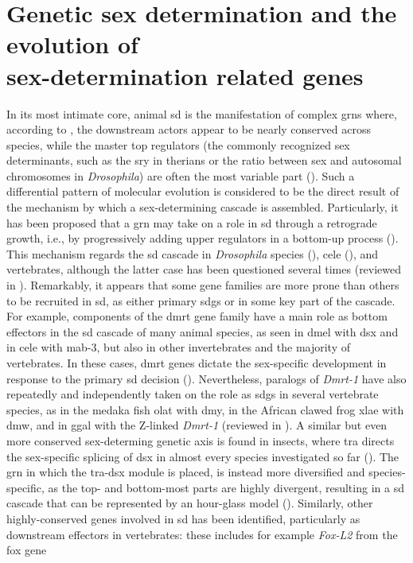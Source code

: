 \section[Genetic sex determination and the evolution of sex-determination related genes]{Genetic sex determination and the evolution of \\ sex-determination related genes}\label{section:introduction-srg}
In its most intimate core, animal \gls{sd} is the manifestation of complex \glspl{grn} where, according to , the downstream actors appear to be nearly conserved across species, while the master top regulators (the commonly recognized sex determinants, such as the \gls{sry} in therians or the ratio between sex and autosomal chromosomes in \textit{Drosophila}) are often the most variable part (). Such a differential pattern of molecular evolution is considered to be the direct result of the mechanism by which a sex-determining cascade is assembled. Particularly, it has been proposed that a \gls{grn} may take on a role in \gls{sd} through a retrograde growth, i.e., by progressively adding upper regulators in a bottom-up process (). This mechanism regards the \gls{sd} cascade in \textit{Drosophila} species (), \gls{cele} (), and vertebrates, although the latter case has been questioned several times (reviewed in ). Remarkably, it appears that some gene families are more prone than others to be recruited in \gls{sd}, as either primary \glspl{sdg} or in some key part of the cascade. For example, components of the \gls{dmrt} gene family have a main role as bottom effectors in the \gls{sd} cascade of many animal species, as seen in \gls{dmel} with \gls{dsx} and in \gls{cele} with \gls{mab-3}, but also in other invertebrates and the majority of vertebrates. In these cases, \gls{dmrt} genes dictate the sex-specific development in response to the primary \gls{sd} decision (). Nevertheless, paralogs of \textit{Dmrt-1} have also repeatedly and independently taken on the role as \glspl{sdg} in several vertebrate species, as in the medaka fish \gls{olat} with \gls{dmy}, in the African clawed frog \gls{xlae} with \gls{dmw}, and in \gls{ggal} with the Z-linked \textit{Dmrt-1} (reviewed in ). A similar but even more conserved sex-determing genetic axis is found in insects, where \gls{tra} directs the sex-specific splicing of \gls{dsx} in almost every species investigated so far (). The \gls{grn} in which the \gls{tra}-\gls{dsx} module is placed, is instead more diversified and species-specific, as the top- and bottom-most parts are highly divergent, resulting in a \gls{sd} cascade that can be represented by an hour-glass model (). Similarly, other highly-conserved genes involved in \gls{sd} has been identified, particularly as downstream effectors in vertebrates: these includes for example \textit{Fox-L2} from the \gls{fox} gene 